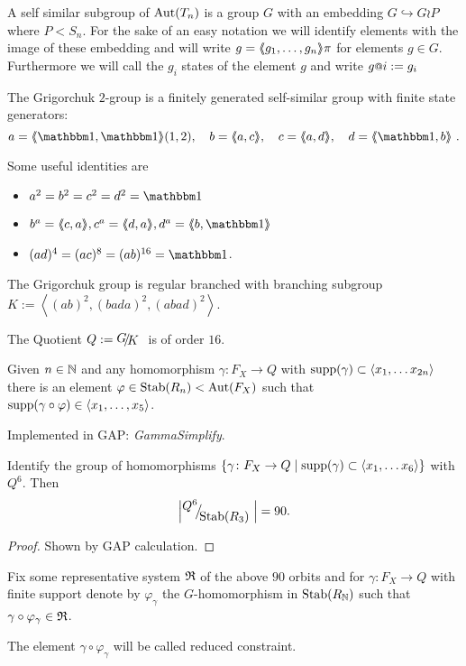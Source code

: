 \documentclass[a4paper,12pt]{article}
\begin{document}
A self similar subgroup of $\textup{Aut}(T_n)$ is a group $G$ with an embedding $G\hookrightarrow G\wr P$  where $P<S_n$. For the sake of an easy notation we
will identify elements with the image of these embedding and will write $g=\langle\negthickspace\langle g_1,\ldots,g_n\rangle\negthickspace\rangle\pi$ for elements $g\in G$. 
Furthermore we will call the $g_i$ states of the element $g$ and write $g\at{i}:=g_i$ 

The Grigorchuk $2$-group is a finitely generated self-similar group with finite state generators:
\[a=\pair{\id,\id}(1,2),\quad b=\pair{a,c},\quad c=\pair{a,d},\quad d=\pair{\id,b}\ . \]

Some useful identities are
\begin{itemize}
 \item $a^2=b^2=c^2=d^2=\id$ 
 \item $b^a= \pair{c,a}, c^a=\pair{d,a}, d^a=\pair{b,\id}$
 \item $(ad)^4=(ac)^8=(ab)^{16}= \id$.
\end{itemize}

\begin{lem}
The Grigorchuk group is regular branched with branching subgroup 
 $K:= \left< (ab)^2,(bada)^2,(abad)^2 \right>$.  
 
 The Quotient $Q := \RNK{G}{K}$ is of order $16$.
\end{lem}

\begin{lem}
 Given $n\in \mathbb{N}$ and any homomorphism $\gamma\colon F_X \to Q$ with $\textup{supp}(\gamma) \subset \left<x_1,\ldots x_{2n}\right>$
 there is an element $\varphi \in \textup{Stab}(R_n)<\textup{Aut}(F_X)$ such that $\textup{supp}(\gamma\circ\varphi) \in \left<x_1,\ldots,x_5\right>$.
\end{lem}
\begin{re}
 Implemented in GAP: \emph{GammaSimplify}.
\end{re}

\begin{lem}
 Identify the group of homomorphisms $\{\gamma \colon F_X \to Q \mid \textup{supp}(\gamma) \subset \left<x_1,\ldots x_6\right>\}$ with $Q^6$. 
 Then \[\left|\RNK{Q^6}{\Stab(R_3)}\right|=90.\]
\end{lem}
\begin{proof}
 Shown by GAP calculation.
\end{proof}
\begin{defi}
 Fix some representative system $\mathfrak{R}$ of the above $90$ orbits and for 
 $\gamma \colon F_X \to Q$ with finite support denote by $\varphi_\gamma$ the $G$-homomorphism in $\textup{Stab}(R_{\mathbb{N}})$ such that $\gamma\circ \varphi_\gamma \in \mathfrak{R}$.
 
 The element $\gamma \circ \varphi_\gamma$ will be called reduced constraint.
\end{defi}
\end{document}
